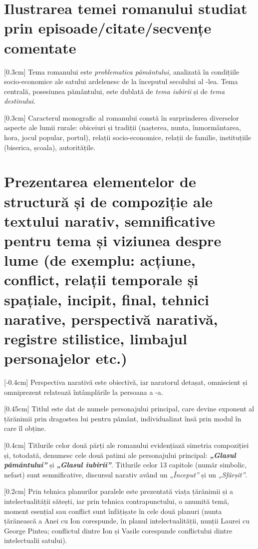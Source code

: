\section{Ilustrarea temei romanului studiat prin episoade/citate/sec\-ven\-țe comentate}

[0.3cm]
Tema romanului este \textit{problematica pământului}, analizată în condițiile so\-ci\-o-e\-co\-no\-mi\-ce ale satului ardelenesc de la începutul secolului al -lea. Tema centrală, posesiunea pământului, este dublată de \textit{tema iubirii} și de \textit{tema destinului}.

[0.3cm]
Caracterul monografic al romanului constă în surprinderea diverselor aspecte ale lumii rurale: obiceiuri și tradiții (nașterea, nunta, înmormântarea, hora, jocul popular, portul), relații socio-economice, relații de familie, instituțiile (biserica, școala), autoritățile.


\section{Prezentarea elementelor de structură și de compoziție ale textului narativ, semnificative pentru tema și viziunea despre lume {\footnotesize\normalfont (de exemplu: acțiune, conflict, relații temporale și spațiale, incipit, final, tehnici narative, perspectivă narativă, registre stilistice, limbajul personajelor etc.)}}

[-0.4cm]
Perspectiva narativă este obiectivă, iar naratorul detașat, omniscient și omniprezent relatează întâmplările la persoana a -a.

[0.45cm]
Titlul este dat de numele personajului principal, care devine exponent al țărănimii prin dragostea lui pentru pământ, individualizat însă prin modul în care îl obține.

[0.4cm]
Titlurile celor două părți ale romanului evidențiază simetria compoziției și, totodată, denumesc cele două patimi ale personajului principal: \textbf{\textit{„Glasul pământului”}} și \textbf{\textit{„Glasul iubirii”}}. Titlurile celor 13 capitole (număr simbolic, nefast) sunt semnificative, discursul narativ având un \textit{„Început”} și un \textit{„Sfârșit”}.

[0.2cm]
Prin tehnica planurilor paralele este prezentată viața țărănimii și a intelectualității sătești, iar prin tehnica contrapunctului, o anumită temă, moment esențial sau conflict sunt înfățișate în cele două planuri (nunta țărănească a Anei cu Ion corespunde, în planul intelectualității, nunții Laurei cu George Pintea;
conflictul dintre Ion și Vasile corespunde conflictului dintre intelectualii satului).

